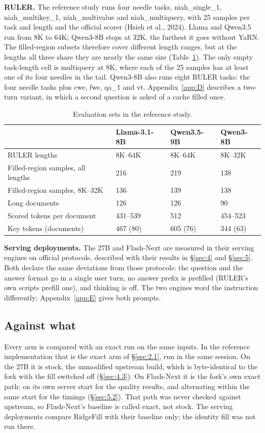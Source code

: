 \documentclass[11pt]{article}
\begin{document}
\textbf{RULER.} The reference study runs four needle tasks, niah\_single\_1, niah\_multikey\_1, niah\_multivalue and niah\_multiquery, with 25 samples per task and length and the official scorer (Hsieh et al., 2024). Llama and Qwen3.5 run from 8K to 64K; Qwen3-8B stops at 32K, the furthest it goes without YaRN. The filled-region subsets therefore cover different length ranges, but at the lengths all three share they are nearly the same size (Table~\ref{tab:5}). The only empty task-length cell is multiquery at 8K, where each of the 25 samples has at least one of its four needles in the tail. Qwen3-8B also runs eight RULER tasks: the four needle tasks plus cwe, fwe, qa\_1 and vt. Appendix~\ref{app:D} describes a two-turn variant, in which a second question is asked of a cache filled once.

\begin{table}[!htbp]
\centering
\caption{Evaluation sets in the reference study.}\label{tab:5}
\small
\setlength{\tabcolsep}{4pt}
\begin{tabular}{llll}
\toprule
 & Llama-3.1-8B & Qwen3.5-9B & Qwen3-8B \\
\midrule
RULER lengths & 8K--64K & 8K--64K & 8K--32K \\
Filled-region samples, all lengths & 216 & 219 & 138 \\
Filled-region samples, 8K--32K & 136 & 139 & 138 \\
Long documents & 126 & 126 & 90 \\
Scored tokens per document & 431--539 & 512 & 454--523 \\
Key tokens (documents) & 467 (80) & 605 (76) & 344 (63) \\
\bottomrule
\end{tabular}
\end{table}

\textbf{Serving deployments.} The 27B and Flash-Next are measured in their serving engines on official protocols, described with their results in \S\ref{sec:4} and \S\ref{sec:5}. Both declare the same deviations from those protocols: the question and the answer format go in a single user turn, no answer prefix is prefilled (RULER's own scripts prefill one), and thinking is off. The two engines word the instruction differently; Appendix~\ref{app:E} gives both prompts.


\subsection{Against what}\label{sec:3.3}
Every arm is compared with an exact run on the same inputs. In the reference implementation that is the exact arm of \S\ref{sec:2.1}, run in the same session. On the 27B it is stock, the unmodified upstream build, which is byte-identical to the fork with the fill switched off (\S\ref{sec:4.3}). On Flash-Next it is the fork's own exact path: on its own server start for the quality results, and alternating within the same start for the timings (\S\ref{sec:5.2}). That path was never checked against upstream, so Flash-Next's baseline is called exact, not stock. The serving deployments compare RidgeFill with their baseline only; the identity fill was not run there.
\end{document}
